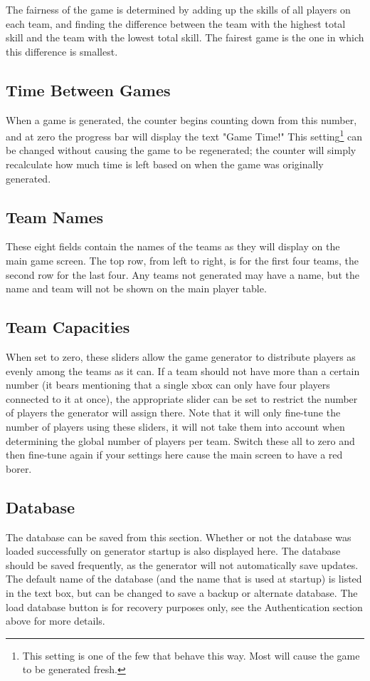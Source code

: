 \documentclass[10pt,a4paper]{report}
\begin{document}
The fairness of the game is determined by adding up the skills of all players on each team, and finding the difference between the team with the highest total skill and the team with the lowest total skill.  The fairest game is the one in which this difference is smallest.

\subsection{Time Between Games}
When a game is generated, the counter begins counting down from this number, and at zero the progress bar will display the text "Game Time!"  This setting\footnote{This setting is one of the few that behave this way.  Most will cause the game to be generated fresh.} can be changed without causing the game to be regenerated; the counter will simply recalculate how much time is left based on when the game was originally generated.

\subsection{Team Names}
These eight fields contain the names of the teams as they will display on the main game screen.  The top row, from left to right, is for the first four teams, the second row for the last four.  Any teams not generated may have a name, but the name and team will not be shown on the main player table.

\subsection{Team Capacities}
When set to zero, these sliders allow the game generator to distribute players as evenly among the teams as it can.  If a team should not have more than a certain number (it bears mentioning that a single xbox can only have four players connected to it at once), the appropriate slider can be set to restrict the number of players the generator will assign there.  Note that it will only fine-tune the number of players using these sliders, it will not take them into account when determining the global number of players per team.  Switch these all to zero and then fine-tune again if your settings here cause the main screen to have a red borer.

\subsection{Database}
The database can be saved from this section.  Whether or not the database was loaded successfully on generator startup is also displayed here.  The database should be saved frequently, as the generator will not automatically save updates.  The default name of the database (and the name that is used at startup) is listed in the text box, but can be changed to save a backup or alternate database.  The load database button is for recovery purposes only, see the Authentication section above for more details.
\end{document}
